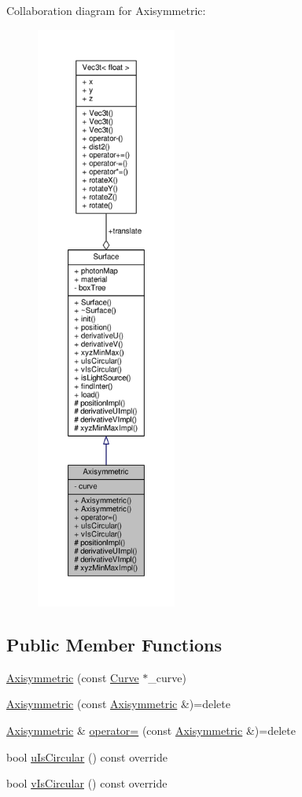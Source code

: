 Collaboration diagram for Axisymmetric\+:\nopagebreak
\begin{figure}[H]
\begin{center}
\leavevmode
\includegraphics[height=550pt]{classAxisymmetric__coll__graph}
\end{center}
\end{figure}
\subsection*{Public Member Functions}
\begin{DoxyCompactItemize}
\item 
\hyperlink{classAxisymmetric_ab9470bf0bc24964f1c8b186d9e900036}{Axisymmetric} (const \hyperlink{classCurve}{Curve} $\ast$\+\_\+curve)
\item 
\hyperlink{classAxisymmetric_a3a9d954abfcb1bbb524382c9d64ae412}{Axisymmetric} (const \hyperlink{classAxisymmetric}{Axisymmetric} \&)=delete
\item 
\hyperlink{classAxisymmetric}{Axisymmetric} \& \hyperlink{classAxisymmetric_ab788a7e5b1f41fb28a128489cb0312d0}{operator=} (const \hyperlink{classAxisymmetric}{Axisymmetric} \&)=delete
\item 
bool \hyperlink{classAxisymmetric_a50b489a9914ad852638b586cc0c6c2dc}{u\+Is\+Circular} () const override
\item 
bool \hyperlink{classAxisymmetric_a63d63250b3ca2a34c2707abf35169657}{v\+Is\+Circular} () const override
\end{DoxyCompactItemize}
